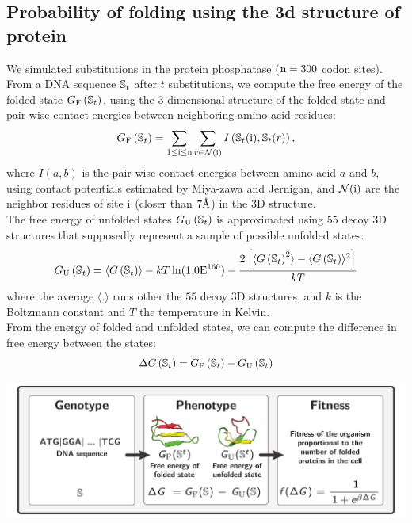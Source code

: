 \documentclass{article}
\begin{document}
\subsection{Probability of folding using the 3d structure of protein}

We simulated substitutions in the protein phosphatase ($\text{n}=300$ codon sites).
From a DNA sequence $\mathbb{S}_{t}$ after $t$ substitutions, we compute the free energy of the folded state $G_{\mathrm{F}}\left(\mathbb{S}_{t}\right)$, using the $3$-dimensional structure of the folded state and pair-wise contact energies between neighboring amino-acid residues:
\begin{equation}
G_{\mathrm{F}}\left(\mathbb{S}_{t}\right) = \sum_{1 \leq \text{i} \leq \text{n}} \sum_{r \in \mathcal{N}(\text{i})} I \left(\mathbb{S}_{t}(\text{i}), \mathbb{S}_{t}(r) \right),
\end{equation}
where $I(a,b)$ is the pair-wise contact energies between amino-acid $a$ and $b$, using contact potentials estimated by Miya-zawa and Jernigan, and $\mathcal{N}(\text{i})$ are the neighbor residues of site $\text{i}$ (closer than $7\text{\normalfont\AA}$) in the $3$D structure.\\

The free energy of unfolded states $G_{\mathrm{U}}\left(\mathbb{S}_{t}\right)$ is approximated using $55$ decoy $3$D structures that supposedly represent a sample of possible unfolded states:
\begin{equation}
G_{\mathrm{U}}\left(\mathbb{S}_{t}\right) = \langle G\left(\mathbb{S}_{t}\right) \rangle - kT \ln (1.0\mathrm{E}^{160}) - \frac{2 \left[ \langle G\left(\mathbb{S}_{t}\right)^2 \rangle - \langle G\left(\mathbb{S}_{t}\right) \rangle^2\right] }{kT}
\end{equation}
where the average $\langle . \rangle$ runs other the $55$ decoy $3$D structures, and $k$ is the Boltzmann constant and $T$ the temperature in Kelvin.\\

From the energy of folded and unfolded states, we can compute the difference in free energy between the states:
\begin{equation}
\Delta G\left(\mathbb{S}_{t}\right) = G_{\mathrm{F}}\left(\mathbb{S}_{t}\right) - G_{\mathrm{U}}\left(\mathbb{S}_{t}\right)
\end{equation}

\begin{center}
	\includegraphics[width=165mm] {artworks/ModelSimuFold.pdf}
\end{center}
\end{document}
